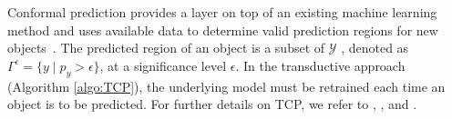 \documentclass[preprint,12pt,authoryear]{elsarticle}
\newtheorem{definition}[theorem1]{Definition}
\begin{document}
%
%



 
Conformal prediction provides a layer on top of an existing machine learning method and uses available data to determine valid prediction regions for new objects~\citep{vovk2005algorithmic}. 
The predicted region of an object is a subset of $\mathcal{Y}$ , denoted as $\Gamma^{\epsilon} = \{ y \mid p_y > \epsilon \}$, at a significance level $\epsilon$. In the transductive approach (Algorithm \ref{algo:TCP}), the underlying model must be retrained each time an object is to be predicted. For further details on TCP, we refer to \cite{vapnik1998statistical}, \cite{shafer2008tutorial}, \cite{vovk2005algorithmic} and \cite{balasubramanian2014conformal}. 
\end{document}
